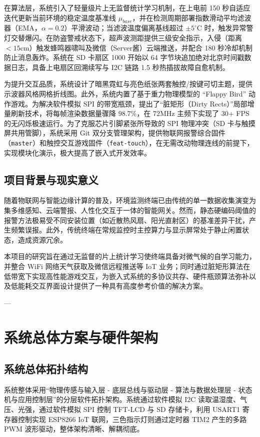 \documentclass[11pt,a4paper]{ctexart}
\begin{document}
在算法层，系统引入了轻量级片上无监督统计学习机制，在上电前 150 秒自适应迭代更新当前环境的稳定温度基准线 $\mu_{base}$，并在检测周期部署指数滑动平均滤波器（EMA，$\alpha=0.2$）平滑波动；当滤波温度偏离基线超过 $\pm 5^\circ\text{C}$ 时，触发异常警灯交替爆闪。在防盗警戒状态下，超声波测距提供三级安全指示，入侵（距离 $<15\text{cm}$）触发蜂鸣器啸叫及微信（Server酱）云端推送，并配合 180 秒冷却机制防止消息轰炸。系统在 SD 卡扇区 1000 开始以 64 字节块追加绝对北京时间戳数据日志，具备上电扇区回溯续写与 I2C 链路 1.5 秒热插拔故障自愈机制。

为提升交互品质，系统设计了暗黑霓虹与亮色纸张两套触控/按键可切主题，提供示波器风格网格折线图。此外，系统内置了基于重力物理模型的 ``Flappy Bird'' 动作游戏。为解决软件模拟 SPI 的带宽瓶颈，提出了“脏矩形（Dirty Rects）”局部增量刷新技术，将每帧渲染数据量骤降 98.7\%，在 72MHz 主频下实现了 30+ FPS 的无闪烁极速运行。为了克服芯片引脚紧张所导致的 SPI 物理冲突（SD 卡与触摸屏共用管脚），系统采用 Git 双分支管理架构，提供物联网报警综合固件（\texttt{master}）和触控交互游戏固件（\texttt{feat-touch}），在无需改动物理连线的前提下，实现模块化演示，极大提高了嵌入式开发效率。

\subsection{项目背景与现实意义}
随着物联网与智能边缘计算的普及，环境监测终端已由传统的单一数据收集演变为集多维感知、云端警报、人性化交互于一体的智能网关。然而，静态硬编码阈值的报警方法极易受不同安装位置（如近散热风扇、阳光直射区）的基准差异干扰，产生频繁误报。此外，传统终端在常规监控时主控算力与显示屏常处于静止闲置状态，造成资源冗余。

本项目的研究旨在通过无监督的片上统计学习使终端具备对微气候的自学习能力，并整合 WiFi 网络天气获取及微信远程推送等 IoT 业务；同时通过脏矩形算法在低带宽下实现高性能游戏交互，为嵌入式系统的多协议共存、硬件瓶颈算法弥补以及低能耗交互界面设计提供了一种具有高度参考价值的解决方案。

---

\section{系统总体方案与硬件架构}

\subsection{系统总体拓扑结构}
系统整体采用“物理传感与输入层 - 底层总线与驱动层 - 算法与数据处理层 - 状态机与应用控制层”的分层软件拓扑架构。系统通过软件模拟 I2C 读取温湿度、气压、光强，通过软件模拟 SPI 控制 TFT-LCD 与 SD 存储卡，利用 USART1 寄存器控制实现 ESP8266 IoT 联网，三色指示灯则通过定时器 TIM2 产生的多路 PWM 波形驱动，整体架构清晰、解耦彻底。
\end{document}
